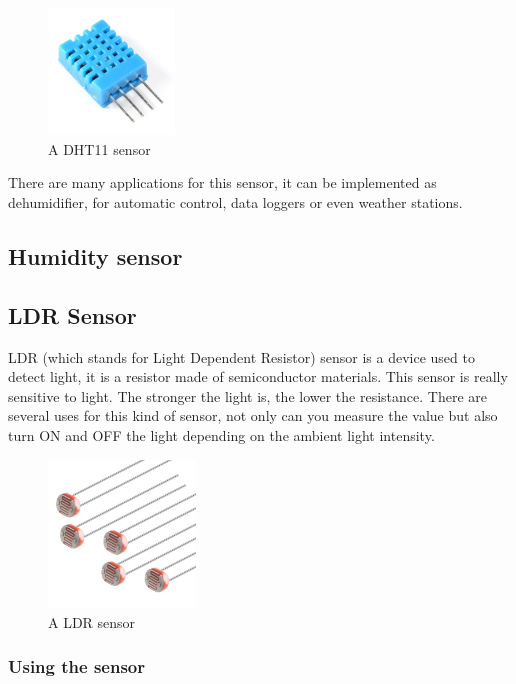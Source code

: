 \begin{figure}[H]
    \centering
    \includegraphics[width=0.3\textwidth]{fig/dht11.jpg}
    \caption{A DHT11 sensor}
    \label{fig:dht11}
\end{figure}

There are many applications for this sensor, it can be implemented as dehumidifier, for automatic control, data loggers or even weather stations. 

\subsection{Humidity sensor}

\subsection{LDR Sensor}
LDR (which stands for Light Dependent Resistor) sensor is a device used to detect light, it is a resistor made of semiconductor materials. This sensor is really sensitive to light. The stronger the light is, the lower the resistance. There are several uses for this kind of sensor, not only can you measure the value but also turn ON and OFF the light depending on the ambient light intensity.

\begin{figure}[htp]
    \centering
    \includegraphics[width=0.35\textwidth]{fig/ldr.jpg}
    \caption{A LDR sensor}
    \label{fig:ldr}
\end{figure}

\subsubsection{Using the sensor}

